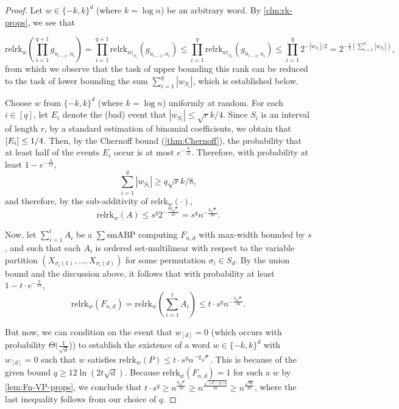 \documentclass[10pt,a4paper]{article}
\theoremstyle{definition}%
\theoremstyle{plain}
\let\Pr\relax
\DeclareMathOperator*{\Pr}{\mathbb{P}}
\newcommand{\sbp}{\sum\mathrm{smABP}}
\newcommand{\rk}{\mathrm{relrk}}
\begin{document}
\begin{proof}
Let  $w\in \{-k,k\}^d$ (where $k = \log n$) be an arbitrary word. By \autoref{clm:rk-props}, we see that 

\[
\rk_w\left(\prod_{i = 1}^{q+1} g_{u_{i-1},u_i}\right) = \prod_{i = 1}^{q+1} \rk_{w|_{S_i}}(g_{u_{i-1},u_i})
\leq \prod_{i = 1}^{q} \rk_{w|_{S_i}}(g_{u_{i-1},u_i})\leq \prod_{i = 1}^q 2^{-|w_{S_i}|/2}= 2^{-\frac12\left(\sum_{i=1}^q |w_{S_i}|\right)},
\]
from which we observe that the task of upper bounding this rank can be reduced to the task of lower bounding the sum $\sum_{i=1}^{q}|w_{S_i}|$, which is established below. 

Choose $w$ from $\{-k,k\}^d$ (where $k = \log n$) uniformly at random. For each $i\in[q]$, let $E_i$ denote the (bad) event that $|w_{S_i}|\leq  \sqrt{r}k/4$. Since $S_i$ is an interval of length $r$, by a standard estimation of binomial coefficients,  
we obtain that $\Pr[E_i]\leq 1/4$. Then,  by the Chernoff bound (\autoref{thm:Chernoff}), the probability that at least half of the events $E_i$ occur is at most $e^{-\frac{q}{12}}$. Therefore, with probability at least $1 - e^{-\frac{q}{12}}$, 
\[
\sum_{i=1}^q |w_{S_i}| \geq {q\sqrt{r}k/8},
\]
and therefore, by the sub-additivity of $\rk_w(\cdot)$,
\[
\rk_w(A) \leq s^q 2^{-\frac{kq\sqrt{r}}{16}} 
= s^q n^{-\frac{{q\sqrt{r}}}{16}}.
\]

Now, let $\sum_{i=1}^t A_i$ be a $\sbp$ computing $F_{n,d}$ with max-width bounded by $s$, and such that each $A_i$ is ordered set-multilinear with respect to the variable partition $(X_{\sigma_i(1)},\ldots, X_{\sigma_i(d)})$ for some permutation $\sigma_i\in S_d$. %
By the union bound and the discussion above, it follows that with probability at least $1-t\cdot e^{-\frac{q}{12}}$, 
\[
\rk_w(F_{n,d}) = \rk_w\left(\sum_{i=1}^t A_i\right) \leq t\cdot s^q n^{-\frac{{q\sqrt{r}}}{16}}.
\]

But now, we can condition on the event that $w_{[d]} = 0$ (which occurs with probability $\Theta(\frac{1}{\sqrt{d}}$)) to establish the existence of a word $w\in \{-k,k\}^d$ with $w_{[d]} = 0$ such that $w$ satisfies $
\rk_w(P)\leq t\cdot s^q n^{-q\sqrt{r}}$. This is because of the given bound $q\geq 12\ln(2t\sqrt{d})$. Because $\rk_w(F_{n,d}) = 1$ for such a $w$ by \autoref{lem:Fn-VP-props}, we conclude that $t\cdot s^q \geq n^{\frac{{q\sqrt{r}}}{16}} \geq n^{\frac{\sqrt{(d-q)q}}{16}}\geq n^{\frac{\sqrt{dq}}{20}}$, where the last inequality follows from our choice of $q$.
    
\end{proof}
\end{document}
